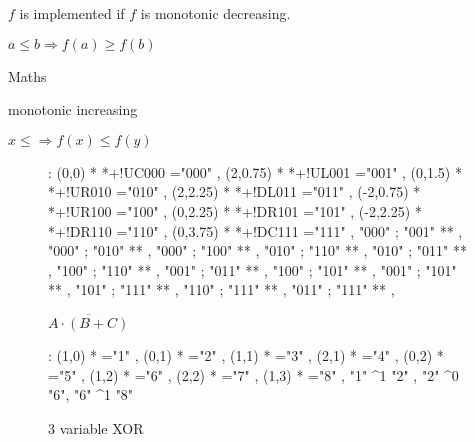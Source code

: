 \documentclass[a4paper,12pt]{article}
\begin{document}
$f$ is implemented if $f$ is monotonic decreasing.

$a \leq b \Rightarrow f(a) \geq f(b)$

Maths

monotonic increasing

$x \leq \Rightarrow f(x) \leq f(y)$

\begin{figure}[ht]

\xy<1cm,0cm>:
\POS (0,0)     *{\bullet} *+!UC{000} ="000" ,
\POS (2,0.75)  *{\bullet} *+!UL{001} ="001"   ,
\POS (0,1.5)   *{\bullet} *+!UR{010} ="010" ,
\POS (2,2.25)  *{\bullet} *+!DL{011} ="011"   ,
\POS (-2,0.75) *{\bullet} *+!UR{100} ="100"   ,
\POS (0,2.25)  *{\circ} *+!DR{101} ="101" ,
\POS (-2,2.25) *{\circ} *+!DR{110} ="110"   ,
\POS (0,3.75)  *{\circ} *+!DC{111} ="111" ,
\POS "000" ; "001" **\dir{-} ,
\POS "000" ; "010" **\dir{-} ,
\POS "000" ; "100" **\dir{-} ,
\POS "010" ; "110" **\dir{-} ,
\POS "010" ; "011" **\dir{-} ,
\POS "100" ; "110" **\dir{-} ,
\POS "001" ; "011" **\dir{-} ,
\POS "100" ; "101" **\dir{-} ,
\POS "001" ; "101" **\dir{-} ,
\POS "101" ; "111" **\dir{-} ,
\POS "110" ; "111" **\dir{-} ,
\POS "011" ; "111" **\dir{-} ,
\endxy

\caption{$\overline{A \cdot (B + C)}$}

\end{figure}

\begin{figure}[ht]

\xy<1cm,0cm>:
\POS (1,0) *{\bullet} ="1" ,
\POS (0,1) *{\circ} ="2" ,
\POS (1,1) *{\circ} ="3" ,
\POS (2,1) *{\circ} ="4" ,
\POS (0,2) *{\bullet} ="5" ,
\POS (1,2) *{\bullet} ="6" ,
\POS (2,2) *{\bullet} ="7" ,
\POS (1,3) *{\circ} ="8" ,
\POS "1" \ar ^{1 } "2" , 
\POS "2" \ar ^{0 } "6",
\POS "6" \ar ^{1 } "8"
\endxy

\caption{$3$ variable XOR}

\end{figure}
\end{document}
